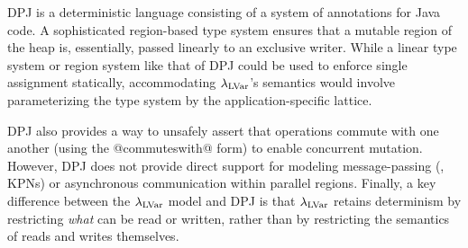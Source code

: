 DPJ \cite{dpj-hotpar09} is a deterministic language
consisting of a system of annotations for Java code.  A sophisticated
region-based type system ensures that a mutable region of the heap is,
essentially, passed linearly to an exclusive writer.
While a linear type system or region system like that of DPJ
could be used to enforce single assignment statically, accommodating $\lambda_{\textrm{LVar}}$'s
semantics would involve parameterizing the
type system by the application-specific lattice.

DPJ also
provides a way to unsafely assert that operations commute with one another (using the @commuteswith@ form) to enable
concurrent mutation.  However, DPJ does not provide direct support for
modeling message-passing (\eg, KPNs) or asynchronous communication
within parallel regions.  
Finally, a key difference between the $\lambda_{\textrm{LVar}}$ model and DPJ 
is that $\lambda_{\textrm{LVar}}$ retains determinism by restricting {\em
  what} can be read or written, rather than by restricting 
the semantics of reads and writes themselves.


%





